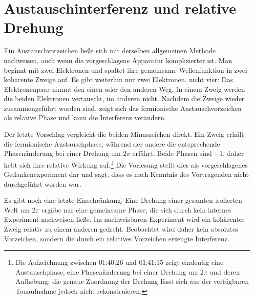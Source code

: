 \begin{classroomqa}
\end{classroomqa}

\section{Austauschinterferenz und relative Drehung}

Ein Austauschvorzeichen ließe sich mit derselben allgemeinen Methode nachweisen, auch wenn die vorgeschlagene Apparatur komplizierter ist. Man beginnt mit zwei Elektronen und spaltet ihre gemeinsame Wellenfunktion in zwei kohärente Zweige auf. Es gibt weiterhin nur zwei Elektronen, nicht vier: Das Elektronenpaar nimmt den einen oder den anderen Weg. In einem Zweig werden die beiden Elektronen vertauscht, im anderen nicht. Nachdem die Zweige wieder zusammengeführt worden sind, zeigt sich das fermionische Austauschvorzeichen als relative Phase und kann die Interferenz verändern.

Der letzte Vorschlag vergleicht die beiden Minuszeichen direkt. Ein Zweig erhält die fermionische Austauschphase, während der andere die entsprechende Phasenänderung bei einer Drehung um \(2\pi\) erfährt. Beide Phasen sind \(-1\), daher hebt sich ihre relative Wirkung auf.\footnote{Die Aufzeichnung zwischen 01:40:26 und 01:41:15 zeigt eindeutig eine Austauschphase, eine Phasenänderung bei einer Drehung um \(2\pi\) und deren Aufhebung; die genaue Zuordnung der Drehung lässt sich aus der verfügbaren Tonaufnahme jedoch nicht rekonstruieren.} Die Vorlesung stellt dies als vorgeschlagenes Gedankenexperiment dar und sagt, dass es nach Kenntnis des Vortragenden nicht durchgeführt worden war.

\begin{classroomqa}
\end{classroomqa}

Es gibt noch eine letzte Einschränkung. Eine Drehung einer gesamten isolierten Welt um \(2\pi\) ergäbe nur eine gemeinsame Phase, die sich durch kein internes Experiment nachweisen ließe. Im nachweisbaren Experiment wird ein kohärenter Zweig relativ zu einem anderen gedreht. Beobachtet wird daher kein absolutes Vorzeichen, sondern die durch ein relatives Vorzeichen erzeugte Interferenz.
